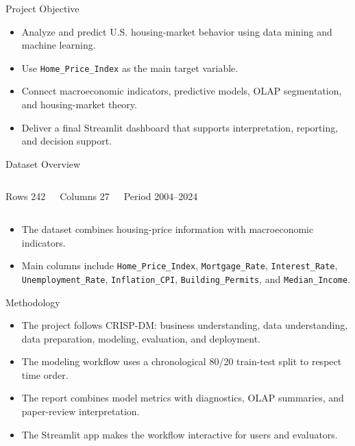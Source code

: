 \documentclass[aspectratio=169]{beamer}
\newcommand{\metricbox}[2]{%
  \begin{block}{#1}
    \centering\Large #2
  \end{block}
}
\begin{document}
\begin{frame}{Project Objective}
\begin{itemize}
  \item Analyze and predict U.S. housing-market behavior using data mining and machine learning.
  \item Use \texttt{Home\_Price\_Index} as the main target variable.
  \item Connect macroeconomic indicators, predictive models, OLAP segmentation, and housing-market theory.
  \item Deliver a final Streamlit dashboard that supports interpretation, reporting, and decision support.
\end{itemize}
\end{frame}

\begin{frame}{Dataset Overview}
\begin{columns}
\metricbox{Rows}{242}
\metricbox{Columns}{27}
\metricbox{Period}{2004--2024}
\end{columns}
\vspace{0.6em}
\begin{itemize}
  \item The dataset combines housing-price information with macroeconomic indicators.
  \item Main columns include \texttt{Home\_Price\_Index}, \texttt{Mortgage\_Rate}, \texttt{Interest\_Rate}, \texttt{Unemployment\_Rate}, \texttt{Inflation\_CPI}, \texttt{Building\_Permits}, and \texttt{Median\_Income}.
\end{itemize}
\end{frame}

\begin{frame}{Methodology}
\begin{itemize}
  \item The project follows CRISP-DM: business understanding, data understanding, data preparation, modeling, evaluation, and deployment.
  \item The modeling workflow uses a chronological 80/20 train-test split to respect time order.
  \item The report combines model metrics with diagnostics, OLAP summaries, and paper-review interpretation.
  \item The Streamlit app makes the workflow interactive for users and evaluators.
\end{itemize}
\end{frame}
\end{document}
